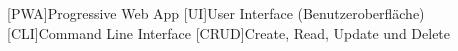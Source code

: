 \begin{acronym}[MMMMMM]
   [PWA]{Progressive Web App}
   [UI]{User Interface (Benutzeroberfläche)}
    [CLI]{Command Line Interface}
    [CRUD]{Create, Read, Update und Delete}
\end{acronym}
